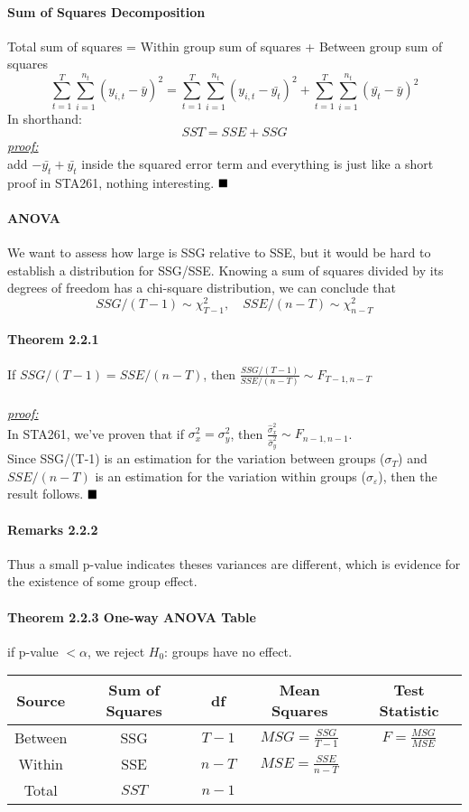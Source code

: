 \documentclass[11pt]{article}
\newcommand{\proof}[0]{\textit{\underline{proof:} }}
\newcommand{\qed}[0]{$\hfill\blacksquare$}
\begin{document}
\paragraph{Sum of Squares Decomposition}
Total sum of squares = Within group sum of squares + Between group sum of squares \\
$$\sum_{t=1}^T\sum_{i=1}^{n_t}(y_{i,t}-\bar{y})^2 = \sum_{t=1}^T\sum_{i=1}^{n_t}(y_{i,t}-\bar{y_t})^2 + \sum_{t=1}^T\sum_{i=1}^{n_t}(\bar{y_t}-\bar{y})^2$$
In shorthand:
$$SST = SSE + SSG$$
\proof\\
add $-\bar{y_t}+\bar{y_t}$ inside the squared error term and everything is just like a short proof in STA261, nothing interesting. \qed
\paragraph{ANOVA}
We want to assess how large is SSG relative to SSE, but it would be hard to establish a distribution for SSG/SSE. Knowing a sum of squares divided by its degrees of freedom has a chi-square distribution, we can conclude that
$$SSG/(T-1) \sim \chi_{T-1}^2, \quad SSE/(n-T) \sim \chi_{n-T}^2$$
\paragraph{Theorem 2.2.1} If $SSG/(T-1) = SSE/(n-T)$, then $\frac{SSG/(T-1)}{SSE/(n-T)} \sim F_{T-1, n-T}$ \\\\
\proof \\
In STA261, we've proven that if $\sigma_x^2 = \sigma_y^2$, then $\frac{\hat{\sigma}_x^2}{\hat{\sigma}_y^2} \sim F_{n-1,n-1}$.\\ Since SSG/(T-1) is an estimation for the variation between groups ($\sigma_T$) and $SSE/(n-T)$ is an estimation for the variation within groups ($\sigma_\varepsilon$), then the result follows. \qed
\paragraph{Remarks 2.2.2} Thus a small p-value indicates theses variances are different, which is evidence for the existence of some group effect.
\paragraph{Theorem 2.2.3 One-way ANOVA Table} if p-value $< \alpha$, we reject $H_0$: groups have no effect. \\
	\begin{tabular}{|c|c|c|c|c|}
		\hline
		Source & Sum of Squares & df & Mean Squares & Test Statistic \\
		\hline
		Between & SSG & $T-1$ & $MSG = \frac{SSG}{T-1}$ & $F = \frac{MSG}{MSE}$ \\
		\hline
		Within & SSE & $n - T$ & $MSE = \frac{SSE}{n - T}$ &\\
		\hline
		Total & $SST$ & $ n -1$ &&\\
		\hline
	\end{tabular}
\end{document}
